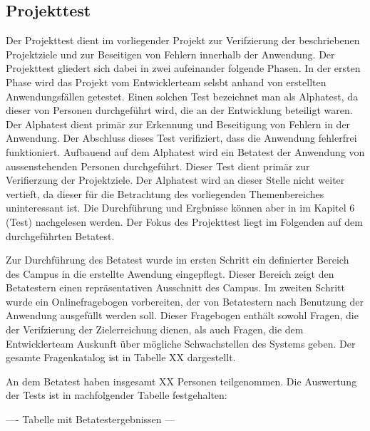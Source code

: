 \subsection{Projekttest}
\label{sec:Projekttest}


Der Projekttest dient im vorliegender Projekt zur Verifzierung der beschriebenen Projektziele
und zur Beseitigen von Fehlern innerhalb der Anwendung. Der Projekttest gliedert sich dabei in zwei aufeinander folgende
Phasen. In der ersten Phase wird das Projekt vom Entwicklerteam selsbt anhand von erstellten Anwendungsfällen getestet.
Einen solchen Test bezeichnet man als Alphatest, da dieser von Personen durchgeführt wird, die an der Entwicklung beteiligt
waren. Der Alphatest dient primär zur Erkennung und Beseitigung von Fehlern in der Anwendung. Der Abschluss
dieses Test verifiziert, dass die Anwendung fehlerfrei funktioniert. Aufbauend auf dem Alphatest wird ein
Betatest der Anwendung von aussenstehenden Personen durchgeführt. Dieser Test dient primär zur Verifierzung der
Projektziele. Der Alphatest wird an dieser Stelle nicht weiter vertieft, da dieser für die Betrachtung des vorliegenden
Themenbereiches uninteressant ist. Die Durchführung und Ergbnisse können aber in \citet{modelierungUndBetrieb2014} im
Kapitel 6 (Test) nachgelesen werden. Der Fokus des Projekttest liegt im Folgenden auf dem durchgeführten Betatest.

Zur Durchführung des Betatest wurde im ersten Schritt ein definierter Bereich des Campus in die erstellte
Awendung eingepflegt. Dieser Bereich zeigt den Betatestern einen repräsentativen Ausschnitt des Campus.
Im zweiten Schritt wurde ein Onlinefragebogen vorbereiten, der von Betatestern nach Benutzung der Anwendung
ausgefüllt werden soll. Dieser Fragebogen enthält sowohl Fragen, die der Verifzierung der Zielerreichung dienen,
als auch Fragen, die dem Entwicklerteam Auskunft über mögliche Schwachstellen des Systems geben. Der gesamte Fragenkatalog
ist in Tabelle XX dargestellt.

An dem Betatest haben insgesamt XX Personen teilgenommen. Die Auswertung der Tests ist in nachfolgender Tabelle
festgehalten:

---- Tabelle mit Betatestergebnissen ---